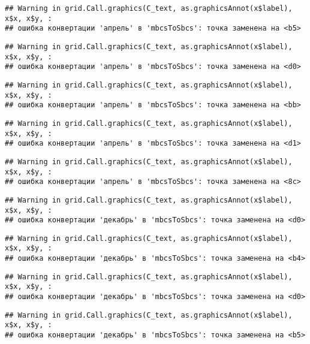 \documentclass[
]{article}
\begin{document}
\begin{verbatim}
## Warning in grid.Call.graphics(C_text, as.graphicsAnnot(x$label), x$x, x$y, :
## ошибка конвертации 'апрель' в 'mbcsToSbcs': точка заменена на <b5>
\end{verbatim}

\begin{verbatim}
## Warning in grid.Call.graphics(C_text, as.graphicsAnnot(x$label), x$x, x$y, :
## ошибка конвертации 'апрель' в 'mbcsToSbcs': точка заменена на <d0>
\end{verbatim}

\begin{verbatim}
## Warning in grid.Call.graphics(C_text, as.graphicsAnnot(x$label), x$x, x$y, :
## ошибка конвертации 'апрель' в 'mbcsToSbcs': точка заменена на <bb>
\end{verbatim}

\begin{verbatim}
## Warning in grid.Call.graphics(C_text, as.graphicsAnnot(x$label), x$x, x$y, :
## ошибка конвертации 'апрель' в 'mbcsToSbcs': точка заменена на <d1>
\end{verbatim}

\begin{verbatim}
## Warning in grid.Call.graphics(C_text, as.graphicsAnnot(x$label), x$x, x$y, :
## ошибка конвертации 'апрель' в 'mbcsToSbcs': точка заменена на <8c>
\end{verbatim}

\begin{verbatim}
## Warning in grid.Call.graphics(C_text, as.graphicsAnnot(x$label), x$x, x$y, :
## ошибка конвертации 'декабрь' в 'mbcsToSbcs': точка заменена на <d0>
\end{verbatim}

\begin{verbatim}
## Warning in grid.Call.graphics(C_text, as.graphicsAnnot(x$label), x$x, x$y, :
## ошибка конвертации 'декабрь' в 'mbcsToSbcs': точка заменена на <b4>
\end{verbatim}

\begin{verbatim}
## Warning in grid.Call.graphics(C_text, as.graphicsAnnot(x$label), x$x, x$y, :
## ошибка конвертации 'декабрь' в 'mbcsToSbcs': точка заменена на <d0>
\end{verbatim}

\begin{verbatim}
## Warning in grid.Call.graphics(C_text, as.graphicsAnnot(x$label), x$x, x$y, :
## ошибка конвертации 'декабрь' в 'mbcsToSbcs': точка заменена на <b5>
\end{verbatim}
\end{document}
